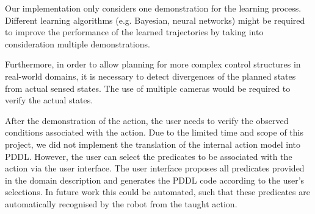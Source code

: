 
Our implementation only considers one demonstration for the learning process.
Different learning algorithms (e.g.
Bayesian, neural networks) might be required to improve the performance of the learned trajectories by taking into consideration multiple demonstrations.

Furthermore, in order to allow planning for more complex control structures in real-world domains, it is necessary to detect divergences of the planned states from actual sensed states.
The use of multiple cameras would be required to verify the actual states.

After the demonstration of the action, the user needs to verify the observed conditions associated with the action.
Due to the limited time and scope of this project, we did not implement the translation of the internal action model into PDDL.
However, the user can select the predicates to be associated with the action via the user interface.
The user interface proposes all predicates provided in the domain description and generates the PDDL code according to the user's selections.
In future work this could be automated, such that these predicates are automatically recognised by the robot from the taught action.

